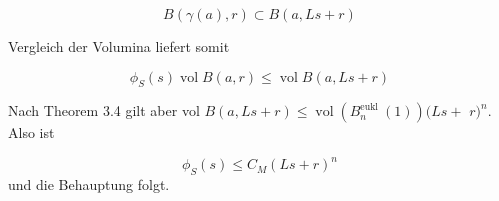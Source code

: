 \documentclass[10pt, letterpaper]{article}
\begin{document}
$$
B(\gamma(a), r) \subset B(a, L s+r)
$$

Vergleich der Volumina liefert somit

$$
\phi_{S}(s) \operatorname{vol} B(a, r) \leq \operatorname{vol} B(a, L s+r)
$$

Nach Theorem 3.4 gilt aber vol $B(a, L s+r) \leq \operatorname{vol}\left(B_{n}^{\text {eukl }}(1)\right)(L s+$ $r)^{n}$. Also ist

$$
\phi_{S}(s) \leq C_{M}(L s+r)^{n}
$$ und die Behauptung folgt.
\end{document}
